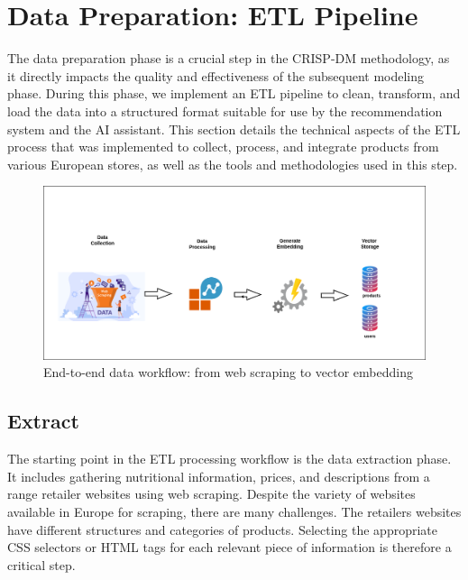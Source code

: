 \section{Data Preparation: ETL Pipeline}


The data preparation phase is a crucial step in the CRISP-DM methodology, as it directly impacts the quality and effectiveness of the subsequent
modeling phase. During this phase, we implement an ETL pipeline to
clean, transform, and load the data into a structured format suitable for
use by the recommendation system and the AI assistant. This section
details the technical aspects of the ETL process that was implemented
to collect, process, and integrate products from various European stores,
as well as the tools and methodologies used in this step.

\begin{center}
\begin{figure}[H]
\includegraphics[scale=0.44]{images/workflow__data.png}
\caption{End-to-end data workflow: from web scraping to vector embedding}
\label{fig:data_workflow}
\end{figure}
\end{center}

\subsection{Extract}

\par The starting point in the ETL processing workflow is the data extraction phase. It includes gathering nutritional information, prices, and
descriptions from a range retailer websites using web scraping. Despite the variety of websites available in Europe for scraping, there
are many challenges. The retailers websites have different structures and
categories of products. Selecting the appropriate CSS selectors or HTML
tags for each relevant piece of information is therefore a critical step.

